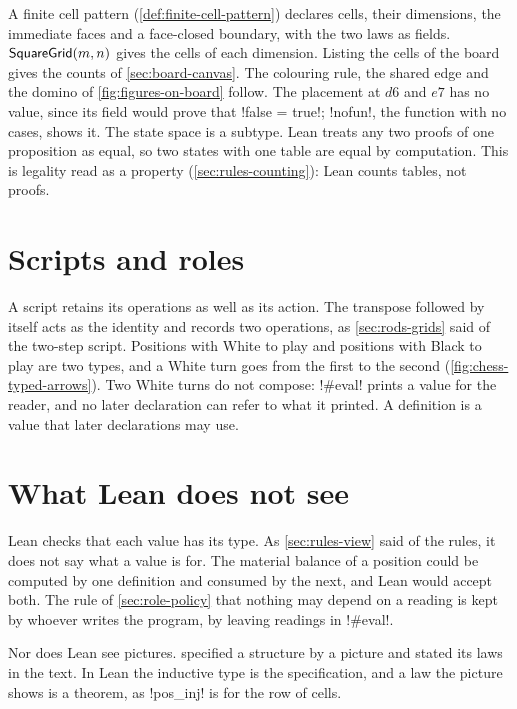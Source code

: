 A finite cell pattern (\cref{def:finite-cell-pattern}) declares cells, their
dimensions, the immediate faces and a face-closed boundary, with the two
laws as fields. ${\mathsf{SquareGrid}}(m,n)$ gives the cells of each dimension.
Listing the cells of the board gives the counts of \cref{sec:board-canvas}.
The colouring rule, the shared edge and the domino of
\cref{fig:figures-on-board} follow. The placement at $d6$ and $e7$ has no
value, since its field would prove that \li!false = true!; \li!nofun!, the
function with no cases, shows it.
The state space is a subtype. Lean treats any two proofs of one proposition
as equal, so two states with one table are equal by computation. This is
legality read as a property (\cref{sec:rules-counting}): Lean counts tables,
not proofs.

\section*{Scripts and roles}
\label{sec:lean-roles}

A script retains its operations as well as its action. The transpose followed
by itself acts as the identity and records two operations, as
\cref{sec:rods-grids} said of the two-step script. Positions with White to
play and positions with Black to play are two types, and a White turn goes
from the first to the second (\cref{fig:chess-typed-arrows}).
Two White turns do not compose:
\li!#eval! prints a value for the reader, and no later declaration can refer
to what it printed. A definition is a value that later declarations may use.

\section*{What Lean does not see}

Lean checks that each value has its type. As \cref{sec:rules-view} said of
the rules, it does not say what a value is for. The material balance of a
position could be computed by one definition and consumed by the next, and
Lean would accept both. The rule of \cref{sec:role-policy} that nothing may
depend on a reading is kept by whoever writes the program, by leaving
readings in \li!#eval!.

Nor does Lean see pictures.  specified a
structure by a picture and stated its laws in the text. In Lean the inductive
type is the specification, and a law the picture shows is a theorem, as
\li!pos_inj! is for the row of cells.

